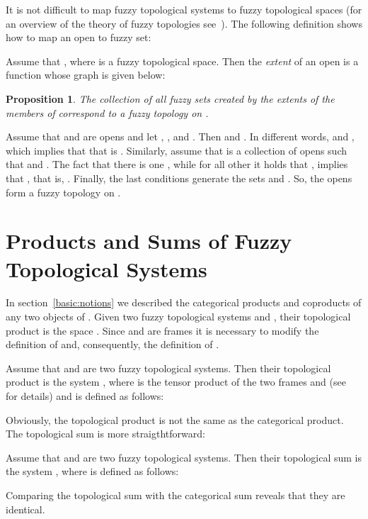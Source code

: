 \documentclass[11pt]{article}
\newtheorem{proposition}[theorem]{Proposition}
\newenvironment{proof}[1][Proof]{\begin{trivlist}
\item[\hskip \labelsep {\bfseries #1}]}{\end{trivlist}}
\newenvironment{definition}[1][Definition]{\begin{trivlist}
\item[\hskip \labelsep {\bfseries #1}]}{\end{trivlist}}
\begin{document}
It is not difficult to map fuzzy topological systems to fuzzy topological spaces 
(for an overview of the theory of fuzzy topologies see~\cite{ying-ming97}). 
The following definition shows how to map an open to fuzzy set:
\begin{definition}
Assume that , where  is a fuzzy topological space. Then the 
{\em extent} of an open  is a function whose graph is given below:

\end{definition}
\begin{proposition}
The collection of all fuzzy sets created by the extents of the members of  
correspond to a fuzzy topology on . 
\end{proposition}
\begin{proof}
Assume that  and  are opens and let ,
, and . Then 
 and . In
different words,   and , which implies
that  that is . 
Similarly, assume that  is a collection of opens such that 
and . The fact that there is one ,
while for all other  it holds that , implies that
, that is, . Finally, the
last conditions generate the sets  and . So, the
opens form a fuzzy topology on .
\end{proof}

\section{Products and Sums of Fuzzy Topological Systems}
In section~\ref{basic:notions} we described the categorical products and coproducts
of any two objects of . Given two fuzzy 
topological systems  and , their topological
product is the space . Since  and  are frames
it is necessary to modify the definition of  and, consequently, the definition of
. 
\begin{definition}
Assume that  and  are two fuzzy topological
systems. Then their topological product  is the system
, where  is the tensor product
of the two frames  and  (see~\cite[pp.~80--85]{vickers90} for details)
and  is defined as follows:

\end{definition}
Obviously, the topological product is not the same as the categorical product. 
The topological sum is more straigthtforward:
\begin{definition}
Assume that  and  are two fuzzy topological
systems. Then their topological sum  is the system
, where  is defined as follows:

\end{definition}
Comparing the topological sum with the categorical sum reveals that they are identical.
\end{document}
